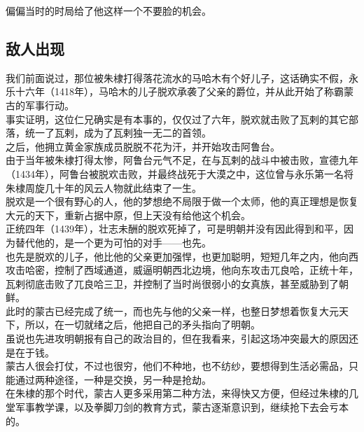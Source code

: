\begin{multicols}{\theparacolNo}
偏偏当时的时局给了他这样一个不要脸的机会。\\

\subsection{敌人出现}
我们前面说过，那位被朱棣打得落花流水的马哈木有个好儿子，这话确实不假，永乐十六年（1418年），马哈木的儿子脱欢承袭了父亲的爵位，并从此开始了称霸蒙古的军事行动。\\

事实证明，这位仁兄确实是有本事的，仅仅过了六年，脱欢就击败了瓦剌的其它部落，统一了瓦剌，成为了瓦剌独一无二的首领。\\

之后，他拥立黄金家族成员脱脱不花为汗，并开始攻击阿鲁台。\\

由于当年被朱棣打得太惨，阿鲁台元气不足，在与瓦剌的战斗中被击败，宣德九年（1434年），阿鲁台被脱欢击败，并最终战死于大漠之中，这位曾与永乐第一名将朱棣周旋几十年的风云人物就此结束了一生。\\

脱欢是一个很有野心的人，他的梦想绝不局限于做一个太师，他的真正理想是恢复大元的天下，重新占据中原，但上天没有给他这个机会。\\

正统四年（1439年），壮志未酬的脱欢死掉了，可是明朝并没有因此得到和平，因为替代他的，是一个更为可怕的对手——也先。\\

也先是脱欢的儿子，他比他的父亲更加强悍，也更加聪明，短短几年之内，他向西攻击哈密，控制了西域通道，威逼明朝西北边境，他向东攻击兀良哈，正统十年，瓦剌彻底击败了兀良哈三卫，并控制了当时尚很弱小的女真族，甚至威胁到了朝鲜。\\

此时的蒙古已经完成了统一，而也先与他的父亲一样，也整日梦想着恢复大元天下，所以，在一切就绪之后，他把自己的矛头指向了明朝。\\

虽说也先进攻明朝报有自己的政治目的，但在我看来，引起这场冲突最大的原因还是在于钱。\\

蒙古人很会打仗，不过也很穷，他们不种地，也不纺纱，要想得到生活必需品，只能通过两种途径，一种是交换，另一种是抢劫。\\

在朱棣的那个时代，蒙古人更多采用第二种方法，来得快又方便，但经过朱棣的几堂军事教学课，以及拳脚刀剑的教育方式，蒙古逐渐意识到，继续抢下去会亏本的。\\


\end{multicols}
